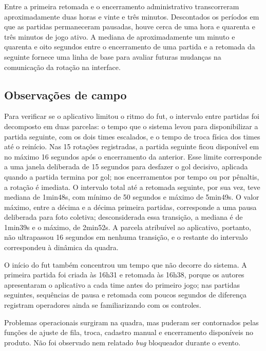         Entre a primeira retomada e o encerramento administrativo transcorreram aproximadamente duas horas e vinte e três minutos. Descontados os períodos em que as partidas permaneceram pausadas, houve cerca de uma hora e quarenta e três minutos de jogo ativo. A mediana de aproximadamente um minuto e quarenta e oito segundos entre o encerramento de uma partida e a retomada da seguinte fornece uma linha de base para avaliar futuras mudanças na comunicação da rotação na interface.

    \subsection{Observações de campo}

        Para verificar se o aplicativo limitou o ritmo do fut, o intervalo entre partidas foi decomposto em duas parcelas: o tempo que o sistema levou para disponibilizar a partida seguinte, com os dois times escalados, e o tempo de troca física dos times até o reinício. Nas 15 rotações registradas, a partida seguinte ficou disponível em no máximo 16 segundos após o encerramento da anterior. Esse limite corresponde a uma janela deliberada de 15 segundos para desfazer o gol decisivo, aplicada quando a partida termina por gol; nos encerramentos por tempo ou por pênaltis, a rotação é imediata. O intervalo total até a retomada seguinte, por sua vez, teve mediana de 1min48s, com mínimo de 50 segundos e máximo de 5min49s. O valor máximo, entre a décima e a décima primeira partidas, corresponde a uma pausa deliberada para foto coletiva; desconsiderada essa transição, a mediana é de 1min39s e o máximo, de 2min52s. A parcela atribuível ao aplicativo, portanto, não ultrapassou 16 segundos em nenhuma transição, e o restante do intervalo correspondeu à dinâmica da quadra.

        O início do fut também concentrou um tempo que não decorre do sistema. A primeira partida foi criada às 16h31 e retomada às 16h38, porque os autores apresentaram o aplicativo a cada time antes do primeiro jogo; nas partidas seguintes, sequências de pausa e retomada com poucos segundos de diferença registram operadores ainda se familiarizando com os controles.

        Problemas operacionais surgiram na quadra, mas puderam ser contornados pelas funções de ajuste de fila, troca, cadastro manual e encerramento disponíveis no produto. Não foi observado nem relatado \textit{bug} bloqueador durante o evento.

